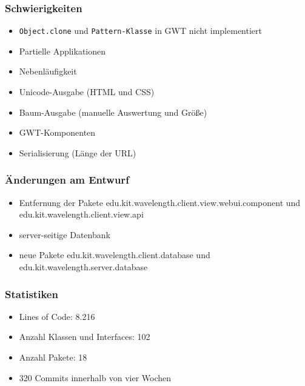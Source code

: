 \documentclass[10pt]{beamer}
\begin{document}
\begin{frame}
\frametitle{Schwierigkeiten}
\begin{itemize}
\item \texttt{Object.clone} und \texttt{Pattern-Klasse} in GWT nicht implementiert
\item Partielle Applikationen
\item Nebenläufigkeit
\item Unicode-Ausgabe (HTML und CSS)
\item Baum-Ausgabe (manuelle Auswertung und Größe)
\item GWT-Komponenten
\item Serialisierung (Länge der URL)
\end{itemize}
\end{frame}

\begin{frame}
\frametitle{Änderungen am Entwurf}
\begin{itemize}
\item Entfernung der Pakete \alert{edu.kit.wavelength.client.view.webui.component} und \alert{edu.kit.wavelength.client.view.api}
\item server-seitige Datenbank
\item neue Pakete \alert{edu.kit.wavelength.client.database} und \alert{edu.kit.wavelength.server.database}
\end{itemize}
\end{frame}

\begin{frame}
\frametitle{Statistiken}
\begin{itemize}
\item Lines of Code: 8.216
\item Anzahl Klassen und Interfaces: 102
\item Anzahl Pakete: 18
\item 320 Commits innerhalb von vier Wochen
\end{itemize}
\end{frame}
\end{document}
